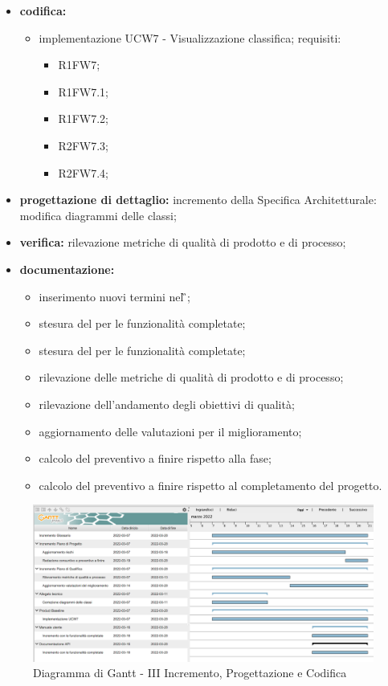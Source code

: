 \begin{itemize}
	\item \textbf{codifica:} 
			\begin{itemize}
				\item implementazione UCW7 - Visualizzazione classifica; requisiti:
					\begin{itemize}
						\item R1FW7;
						\item R1FW7.1;
						\item R1FW7.2;
						\item R2FW7.3;
						\item R2FW7.4;
					\end{itemize}
			\end{itemize}
	\item \textbf{progettazione di dettaglio:} incremento della Specifica Architetturale: modifica diagrammi delle classi;
 	\item \textbf{verifica:} rilevazione metriche di qualità di prodotto e di processo;
	\item \textbf{documentazione:} 
	 \begin{itemize}
		\item inserimento nuovi termini nel \G{};
		\item stesura del \MU{} per le funzionalità completate;
		\item stesura del \MS{} per le funzionalità completate;
     	\item rilevazione delle metriche di qualità di prodotto e di processo;
     	\item rilevazione dell’andamento degli obiettivi di qualità;
		\item aggiornamento delle valutazioni per il miglioramento; 
		\item calcolo del preventivo a finire rispetto alla fase;
		\item calcolo del preventivo a finire rispetto al completamento del progetto.
	 \end{itemize}
\end{itemize}
\begin{figure}[H]
	\centering
	\includegraphics[scale=0.35]{Sezioni/gantt/III_incremento.png}
	\caption{Diagramma di Gantt - III Incremento, Progettazione e Codifica}
\end{figure}

